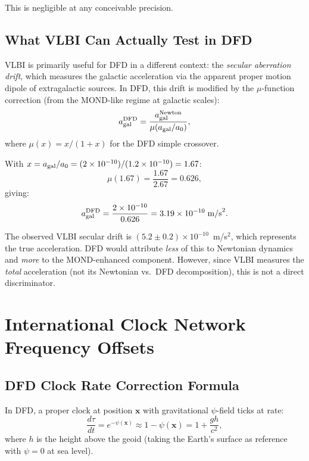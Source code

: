 \documentclass[aps,prd,twocolumn,superscriptaddress,nofootinbib]{revtex4-2}
\begin{document}
This is negligible at any conceivable precision.

\subsection{What VLBI Can Actually Test in DFD}

VLBI is primarily useful for DFD in a different context: the
\emph{secular aberration drift}, which measures the galactic
acceleration via the apparent proper motion dipole of extragalactic
sources. In DFD, this drift is modified by the $\mu$-function
correction (from the MOND-like regime at galactic scales):
\begin{equation}
a_{\rm gal}^{\rm DFD} = \frac{a_{\rm gal}^{\rm Newton}}
{\mu(a_{\rm gal}/a_0)},
\end{equation}
where $\mu(x) = x/(1+x)$ for the DFD simple crossover.

With $x = a_{\rm gal}/a_0 = (2\times10^{-10})/(1.2\times10^{-10}) = 1.67$:
\begin{equation}
\mu(1.67) = \frac{1.67}{2.67} = 0.626,
\end{equation}
giving:
\begin{equation}
a_{\rm gal}^{\rm DFD} = \frac{2\times10^{-10}}{0.626}
= 3.19\times10^{-10}\;\text{m/s}^2.
\end{equation}

The observed VLBI secular drift is $(5.2\pm0.2)\times10^{-10}$~m/s$^2$,
which represents the true acceleration. DFD would attribute
\emph{less} of this to Newtonian dynamics and \emph{more} to
the MOND-enhanced component. However, since VLBI measures the
\emph{total} acceleration (not its Newtonian vs.\ DFD decomposition),
this is not a direct discriminator.

\section{International Clock Network Frequency Offsets}

\subsection{DFD Clock Rate Correction Formula}

In DFD, a proper clock at position $\mathbf{x}$ with gravitational
$\psi$-field ticks at rate:
\begin{equation}
\frac{d\tau}{dt} = e^{-\psi(\mathbf{x})} \approx 1 - \psi(\mathbf{x})
= 1 + \frac{g h}{c^2},
\end{equation}
where $h$ is the height above the geoid (taking the Earth's
surface as reference with $\psi = 0$ at sea level).
\end{document}
